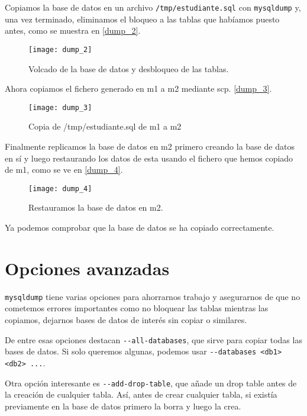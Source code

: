 Copiamos la base de datos en un archivo \verb|/tmp/estudiante.sql| con \verb|mysqldump| y, una vez terminado, eliminamos el bloqueo a las tablas que habíamos puesto antes, como se muestra en \eqref{dump_2}.

\begin{figure}[h!]
\begin{center}
\caption{Volcado de la base de datos y desbloqueo de las tablas.}
\label{dump_2}
\texttt{[image: dump\_2]}
\end{center}
\end{figure}

Ahora copiamos el fichero generado en m1 a m2 mediante scp. \eqref{dump_3}.

\begin{figure}[h!]
\begin{center}
\caption{Copia de /tmp/estudiante.sql de m1 a m2}
\label{dump_3}
\texttt{[image: dump\_3]}
\end{center}
\end{figure}

Finalmente replicamos la base de datos en m2 primero creando la base de datos en sí y luego restaurando los datos de esta usando el fichero que hemos copiado de m1, como se ve en \eqref{dump_4}.

\begin{figure}[h!]
\begin{center}
\caption{Restauramos la base de datos en m2.}
\label{dump_4}
\texttt{[image: dump\_4]}
\end{center}
\end{figure}

Ya podemos comprobar que la base de datos se ha copiado correctamente.


\section{Opciones avanzadas}

\verb|mysqldump| tiene varias opciones para ahorrarnos trabajo y asegurarnos de que no cometemos errores importantes como no bloquear las tablas mientras las copiamos, dejarnos bases de datos de interés sin copiar o similares.

De entre esas opciones destacan \verb|--all-databases|, que sirve para copiar todas las bases de datos. Si solo queremos algunas, podemos usar \verb|--databases <db1> <db2> ...|. 

Otra opción interesante es \verb|--add-drop-table|, que añade un drop table antes de la creación de cualquier tabla. Así, antes de crear cualquier tabla, si existía previamente en la base de datos primero la borra y luego la crea.

